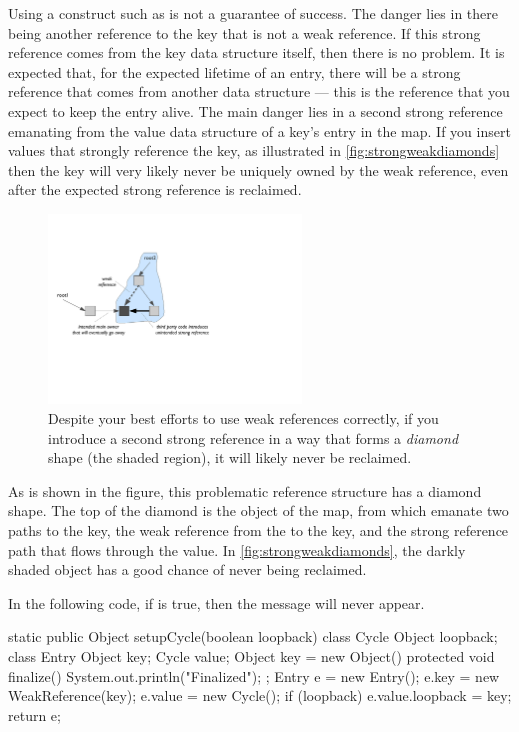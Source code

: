 Using a construct such as  is not a guarantee of success. The
danger lies in there being another reference to the key that is not a weak
reference. If this strong reference comes from the key data structure itself,
then there is no problem. It is expected that, for the expected lifetime of an
entry, there will be a strong reference that comes from another data structure
--- this is the reference that you expect to keep the entry alive. The main
danger lies in a second strong reference emanating from the value data structure
of a key's entry in the map. If you insert values that strongly reference the
key, as illustrated in \autoref{fig:strongweakdiamonds} then the key will very
likely never be uniquely owned by the weak reference, even after the expected
strong reference is reclaimed.

\begin{figure}[h]   %
\centering
	\includegraphics[width=0.6\textwidth]{part2/Figures/lifetime/strongweakdiamonds}
	\caption{Despite your best efforts to use weak references correctly, if you
	introduce a second strong reference in a way that forms a
	\emph{diamond} shape (the shaded region), it will likely never be reclaimed.}
	\label{fig:strongweakdiamonds}
\end{figure}

As is shown in the figure, this problematic reference structure has a diamond
shape. The top of the diamond is the  object of the map, from which
emanate two paths to the key, the weak reference from the  to the
key, and the strong reference path that flows through the value. In
\autoref{fig:strongweakdiamonds}, the darkly shaded object has a good chance of
never being reclaimed. 

In the following code, if  is true, then the 
message will never appear.
\begin{shortlisting}
static public Object setupCycle(boolean loopback) {
   class Cycle {
       Object loopback;
   }
   class Entry {
       Object key;
       Cycle value;
   }
   Object key = new Object() {
           protected void finalize() {
               System.out.println("Finalized");
           }
       };
   Entry e = new Entry();
   e.key = new WeakReference(key);
   e.value = new Cycle();
   if (loopback) e.value.loopback = key;
   return e;
}
\end{shortlisting}

